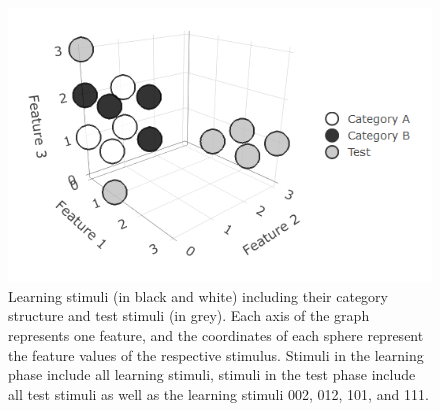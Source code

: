 \documentclass[a4paper,man,natbib]{apa6}
\begin{document}
\begin{figure}[htbp]
\centering
\includegraphics[width = \textwidth]{fig_environment.png}
\caption{Learning stimuli (in black and white) including their category structure and test stimuli (in grey). Each axis of the graph represents one feature, and the coordinates of each sphere represent the feature values of the respective stimulus. Stimuli in the learning phase include all learning stimuli, stimuli in the test phase include all test stimuli as well as the learning stimuli 002, 012, 101, and 111.}
\label{fig:environment}
\end{figure}
\end{document}
